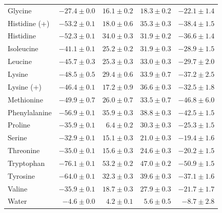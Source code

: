 \documentclass[9pt]{article}
\begin{document}
\begin{table}
{\begin{tabular}{lrrrr}
Glycine           & $-27.4 \pm 0.0$               & $  16.1 \pm 0.2$           & $18.3 \pm 0.2$                & $-22.1 \pm 1.4$                    \\
Histidine (+)     & $-53.2 \pm 0.1$               & $  18.0 \pm 0.6$           & $35.3 \pm 0.3$                & $-38.4 \pm 1.5$                    \\
Histidine         & $-52.3 \pm 0.1$               & $  34.0 \pm 0.3$           & $31.9 \pm 0.2$                & $-36.6 \pm 1.4$                    \\
Isoleucine        & $-41.1 \pm 0.1$               & $  25.2 \pm 0.2$           & $31.9 \pm 0.3$                & $-28.9 \pm 1.5$                    \\
Leucine           & $-45.7 \pm 0.3$               & $  25.3 \pm 0.3$           & $33.0 \pm 0.3$                & $-29.7 \pm 2.0$                    \\
Lysine            & $-48.5 \pm 0.5$               & $  29.4 \pm 0.6$           & $33.9 \pm 0.7$                & $-37.2 \pm 2.5$                    \\
Lysine (+)        & $-46.4 \pm 0.1$               & $  17.2 \pm 0.9$           & $36.6 \pm 0.3$                & $-32.5 \pm 1.8$                    \\
Methionine        & $-49.9 \pm 0.7$               & $  26.0 \pm 0.7$           & $33.5 \pm 0.7$                & $-46.8 \pm 6.0$                    \\
Phenylalanine     & $-56.9 \pm 0.1$               & $  35.9 \pm 0.3$           & $38.8 \pm 0.3$                & $-42.5 \pm 1.5$                    \\
Proline           & $-35.9 \pm 0.1$               & $   6.4 \pm 0.2$           & $30.3 \pm 0.3$                & $-25.3 \pm 1.5$                    \\
Serine            & $-32.9 \pm 0.1$               & $  15.1 \pm 0.3$           & $21.0 \pm 0.3$                & $-19.4 \pm 1.6$                    \\
Threonine         & $-35.0 \pm 0.1$               & $  15.6 \pm 0.3$           & $24.6 \pm 0.3$                & $-20.2 \pm 1.5$                    \\
Tryptophan        & $-76.1 \pm 0.1$               & $  53.2 \pm 0.2$           & $47.0 \pm 0.2$                & $-50.9 \pm 1.5$                    \\
Tyrosine          & $-64.0 \pm 0.1$               & $  32.3 \pm 0.3$           & $39.6 \pm 0.3$                & $-37.1 \pm 1.6$                    \\
Valine            & $-35.9 \pm 0.1$               & $  18.7 \pm 0.3$           & $27.9 \pm 0.3$                & $-21.7 \pm 1.7$                    \\
Water             & $ -4.6 \pm 0.0$               & $   4.2 \pm 0.1$           & $ 5.6 \pm 0.5$                & $ -8.7 \pm 2.8$                    \\
\bottomrule
\end{tabular}
}
\end{table}
\end{document}
